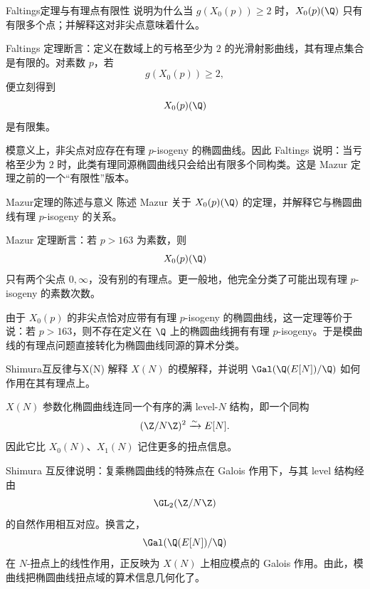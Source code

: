 \begin{problem}{Faltings定理与有理点有限性}
说明为什么当 $g(X_0(p))\ge2$ 时，$X_0(p)(\Q)$ 只有有限多个点；并解释这对非尖点意味着什么。
\end{problem}
\begin{solution}
Faltings 定理断言：定义在数域上的亏格至少为 $2$ 的光滑射影曲线，其有理点集合是有限的。对素数 $p$，若
\[
g(X_0(p))\ge2,
\]
便立刻得到
\[
X_0(p)(\Q)
\]
是有限集。

模意义上，非尖点对应存在有理 $p$-isogeny 的椭圆曲线。因此 Faltings 说明：当亏格至少为 $2$ 时，此类有理同源椭圆曲线只会给出有限多个同构类。这是 Mazur 定理之前的一个“有限性”版本。
\end{solution}

\begin{problem}{Mazur定理的陈述与意义}
陈述 Mazur 关于 $X_0(p)(\Q)$ 的定理，并解释它与椭圆曲线有理 $p$-isogeny 的关系。
\end{problem}
\begin{solution}
Mazur 定理断言：若 $p>163$ 为素数，则
\[
X_0(p)(\Q)
\]
只有两个尖点 $0,\infty$，没有别的有理点。更一般地，他完全分类了可能出现有理 $p$-isogeny 的素数次数。

由于 $X_0(p)$ 的非尖点恰对应带有有理 $p$-isogeny 的椭圆曲线，这一定理等价于说：若 $p>163$，则不存在定义在 $\Q$ 上的椭圆曲线拥有有理 $p$-isogeny。于是模曲线的有理点问题直接转化为椭圆曲线同源的算术分类。
\end{solution}

\begin{problem}{Shimura互反律与X(N)}
解释 $X(N)$ 的模解释，并说明 $\Gal(\Q(E[N])/\Q)$ 如何作用在其有理点上。
\end{problem}
\begin{solution}
$X(N)$ 参数化椭圆曲线连同一个有序的满 level-$N$ 结构，即一个同构
\[
(\Z/N\Z)^2\xrightarrow{\sim}E[N].
\]
因此它比 $X_0(N)$、$X_1(N)$ 记住更多的扭点信息。

Shimura 互反律说明：复乘椭圆曲线的特殊点在 Galois 作用下，与其 level 结构经由
\[
\GL_2(\Z/N\Z)
\]
的自然作用相互对应。换言之，
\[
\Gal(\Q(E[N])/\Q)
\]
在 $N$-扭点上的线性作用，正反映为 $X(N)$ 上相应模点的 Galois 作用。由此，模曲线把椭圆曲线扭点域的算术信息几何化了。
\end{solution}
